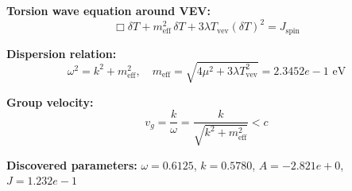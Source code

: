 
\textbf{Torsion wave equation around VEV:}
\begin{equation}
  \Box \delta T + m_{\text{eff}}^2 \, \delta T + 3\lambda T_{\text{vev}} (\delta T)^2 = J_{\text{spin}}
\end{equation}

\textbf{Dispersion relation:}
\begin{equation}
  \omega^2 = k^2 + m_{\text{eff}}^2, \quad
  m_{\text{eff}} = \sqrt{4\mu^2 + 3\lambda T_{\text{vev}}^2} = 2.3452e-1 \text{ eV}
\end{equation}

\textbf{Group velocity:}
\begin{equation}
  v_g = \frac{k}{\omega} = \frac{k}{\sqrt{k^2 + m_{\text{eff}}^2}} < c
\end{equation}

\textbf{Discovered parameters:}
$\omega = 0.6125$, \quad
$k = 0.5780$, \quad
$A = -2.821e+0$, \quad
$J = 1.232e-1$